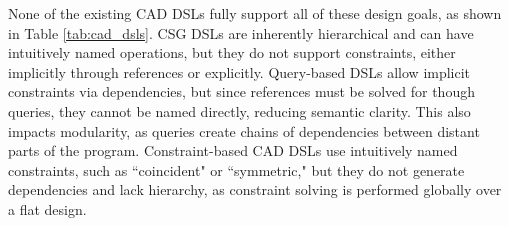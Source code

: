 
None of the existing CAD DSLs fully support all of these design goals, as shown in Table \ref{tab:cad_dsls}. CSG DSLs are inherently hierarchical and can have intuitively named operations, but they do not support constraints, either implicitly through references or explicitly. Query-based DSLs allow implicit constraints via dependencies, but since references must be solved for though queries, they cannot be named directly, reducing semantic clarity. This also impacts modularity, as queries create chains of dependencies between distant parts of the program. Constraint-based CAD DSLs use intuitively named constraints, such as ``coincident" or ``symmetric," but they do not generate dependencies and lack hierarchy, as constraint solving is performed globally over a flat design.





